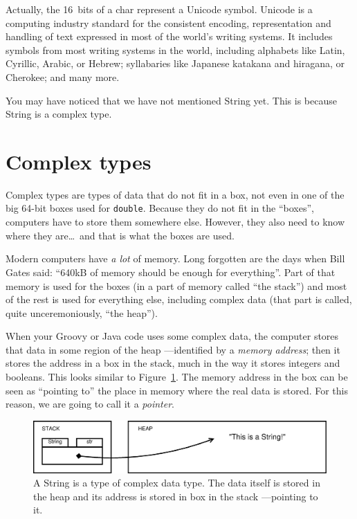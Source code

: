 Actually, the 16~bits of a char represent a Unicode symbol. Unicode is
a computing industry standard for the consistent encoding,
representation and handling of text expressed in most of the world's
writing systems. It includes symbols from most writing systems in
the world, including alphabets like Latin, Cyrillic, Arabic, or
Hebrew; syllabaries like Japanese katakana and hiragana, or
Cherokee; and many more. 

You may have noticed that we have not mentioned String yet. This is
because String is a complex type. 

\section{Complex types}
\label{sec:complex-types}

Complex types are types of data that do not fit in a box, not even in
one of the big 64-bit boxes used for \verb+double+. Because they do
not fit in the ``boxes'', computers have to store them somewhere
else. However, they also need to know where they are\ldots~and that is
what the boxes are used. 

Modern computers have \emph{a lot} of memory. Long forgotten are the
days when Bill Gates said: ``640kB of memory should be enough for
everything''. Part of that memory is used for the boxes (in a part of
memory called ``the stack'') and most of the rest is used for
everything else, including complex data (that part is called, quite
unceremoniously, ``the heap''). 

When your Groovy or Java code uses some complex data, the computer
stores that data in some region of the heap ---identified by a \emph{memory
  address}; then it stores the address in a box in the stack, much in
the way it stores integers and booleans. This looks similar to
Figure~\ref{fig:compledata}. The memory address in the box can be seen
as ``pointing to'' the place in memory where the real data is
stored. For this reason, we are going to call it a \emph{pointer}. 

\begin{figure}[htbp]
  \centering
  \includegraphics[width=\textwidth]{gfx/variables-string}
  \caption{A String is a type of complex data type. The data itself is
    stored in the heap and its address is stored in box in the stack
    ---pointing to it. }
  \label{fig:compledata}
\end{figure}

